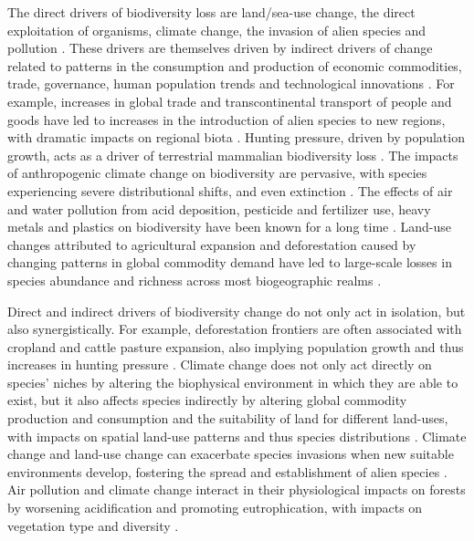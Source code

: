 The direct drivers of biodiversity loss are land/sea-use change, the direct exploitation of organisms, climate change, the invasion of alien species and pollution \citep{ipbes_summary_2019}. These drivers are themselves driven by indirect drivers of change related to patterns in the consumption and production of economic commodities, trade, governance, human population trends and technological innovations \citep{ipbes_summary_2019}. For example, increases in global trade and transcontinental transport of people and goods have led to increases in the introduction of alien species to new regions, with dramatic impacts on regional biota \citep{mooney_evolutionary_2001, foley_global_2005}. Hunting pressure, driven by population growth, acts as a driver of terrestrial mammalian biodiversity loss \citep{romeromunoz_habitat_2021}. The impacts of anthropogenic climate change on biodiversity are pervasive, with species experiencing severe distributional shifts, and even extinction \citep{ipbes_summary_2019, struebig_targeted_2015}. The effects of air and water pollution from acid deposition, pesticide and fertilizer use, heavy metals and plastics on biodiversity have been known for a long time \citep{mcneely_sinking_1992}. Land-use changes attributed to agricultural expansion and deforestation caused by changing patterns in global commodity demand have led to large-scale losses in species abundance and richness across most biogeographic realms \citep{newbold_global_2015}.

Direct and indirect drivers of biodiversity change do not only act in isolation, but also synergistically. For example, deforestation frontiers are often associated with cropland and cattle pasture expansion, also implying population growth and thus increases in hunting pressure \citep{romeromunoz_habitat_2021}. Climate change does not only act directly on species' niches by altering the biophysical environment in which they are able to exist, but it also affects species indirectly by altering global commodity production and consumption and the suitability of land for different land-uses, with impacts on spatial land-use patterns and thus species distributions \citep{kapitza_assessing_2021}. Climate change and land-use change can exacerbate species invasions when new suitable environments develop, fostering the spread and establishment of alien species \citep{bellard_will_2013}. Air pollution and climate change interact in their physiological impacts on forests by worsening acidification and promoting eutrophication, with impacts on vegetation type and diversity \citep{bytnerowicz_integrated_2007}.

